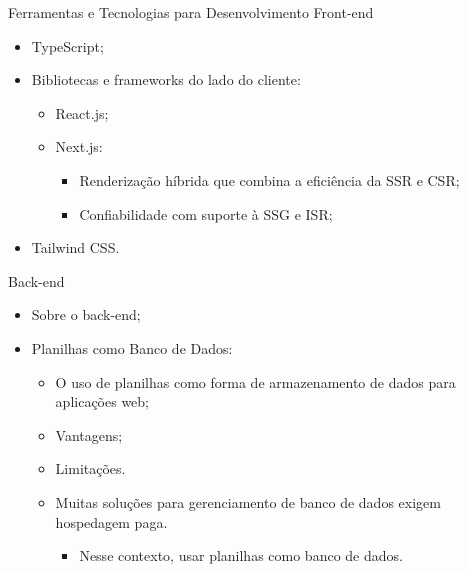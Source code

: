 \begin{frame}{Ferramentas e Tecnologias para Desenvolvimento Front-end}
    \begin{itemize}
        \item TypeScript; \vspace{0.5cm}
        \item Bibliotecas e frameworks do lado do cliente: \vspace{0.5cm}
        \begin{itemize}
            \item React.js; \vspace{0.25cm}
            \item Next.js: \vspace{0.25cm}
                \begin{itemize}
                    \item Renderização híbrida que combina a eficiência da SSR e CSR; \vspace{0.25cm}
                    \item Confiabilidade com suporte à SSG e ISR; \vspace{0.25cm}
                \end{itemize}
        \end{itemize}
        \item Tailwind CSS. \vspace{0.5cm}
    \end{itemize}
\end{frame}

\begin{frame}{Back-end}
    \begin{itemize}
        \item Sobre o back-end; \vspace{0.25cm}
        \item Planilhas como Banco de Dados: \vspace{0.25cm}
              \begin{itemize}
                  \item O uso de planilhas como forma de armazenamento de dados para aplicações web; \vspace{0.25cm}
                  \item Vantagens; \vspace{0.25cm}
                  \item Limitações. \vspace{0.25cm}
                  \item Muitas soluções para gerenciamento de banco de dados exigem hospedagem paga. \vspace{0.25cm}
                  \begin{itemize}
                    \item Nesse contexto, usar planilhas como banco de dados.
                  \end{itemize}
              \end{itemize}
    \end{itemize}
\end{frame}


